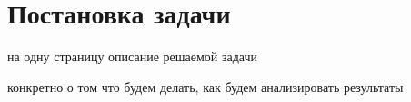 \section{Постановка задачи}

на одну страницу описание решаемой задачи

конкретно о том что будем делать, как будем анализировать результаты

